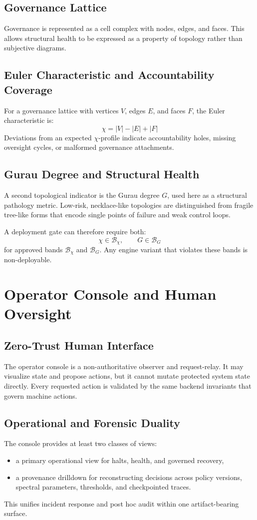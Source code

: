 \documentclass[11pt]{article}
\begin{document}
\subsection{Governance Lattice}
Governance is represented as a cell complex with nodes, edges, and faces. This allows structural health to be expressed as a property of topology rather than subjective diagrams.

\subsection{Euler Characteristic and Accountability Coverage}
For a governance lattice with vertices \(V\), edges \(E\), and faces \(F\), the Euler characteristic is:
\[
\chi = |V| - |E| + |F| \tag{14}
\]
Deviations from an expected \(\chi\)-profile indicate accountability holes, missing oversight cycles, or malformed governance attachments.

\subsection{Gurau Degree and Structural Health}
A second topological indicator is the Gurau degree \(G\), used here as a structural pathology metric. Low-risk, necklace-like topologies are distinguished from fragile tree-like forms that encode single points of failure and weak control loops.

A deployment gate can therefore require both:
\[
\chi \in \mathcal{B}_{\chi}, \qquad G \in \mathcal{B}_{G} \tag{15}
\]
for approved bands \(\mathcal{B}_{\chi}\) and \(\mathcal{B}_{G}\). Any engine variant that violates these bands is non-deployable.

\section{Operator Console and Human Oversight}
\subsection{Zero-Trust Human Interface}
The operator console is a non-authoritative observer and request-relay. It may visualize state and propose actions, but it cannot mutate protected system state directly. Every requested action is validated by the same backend invariants that govern machine actions.

\subsection{Operational and Forensic Duality}
The console provides at least two classes of views:
\begin{itemize}[leftmargin=1cm]
  \item a primary operational view for halts, health, and governed recovery,
  \item a provenance drilldown for reconstructing decisions across policy versions, spectral parameters, thresholds, and checkpointed traces.
\end{itemize}
This unifies incident response and post hoc audit within one artifact-bearing surface.
\end{document}
